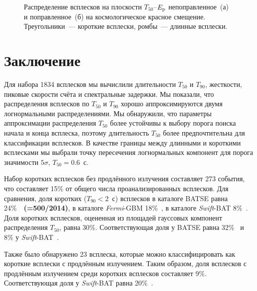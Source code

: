 \begin{figure}[h]
  \begin{minipage}[h]{0.5\textwidth}
  \end{minipage}
  \hfill
  \begin{minipage}[h]{0.5\textwidth}
  \end{minipage}
  \caption{Распределение всплесков на плоскости $T_{50}$--$E_{{\mathrm{p}}}$ непоправленное~(а) 
  и поправленное~(б) на космологическое красное смещение. 
  Треугольники~--- короткие всплески, ромбы~--- длинные всплески.}
  \label{img:T50EpzCorr}  
\end{figure}
\clearpage

\section{Заключение} \label{sec:Conclision}
Для набора 1834 всплесков мы вычислили длительности $T_{50}$ и $T_{90}$, жесткости, 
пиковые скорости счёта и спектральные задержки. Мы показали, что распределения 
всплесков по $T_{50}$ и $T_{90}$ хорошо аппроксимируются двумя логнормальными 
распределениями. Мы обнаружили, что параметры аппроксимации распределения $T_{50}$ 
более устойчивы к выбору порога поиска начала и конца всплеска, поэтому длительность 
$T_{50}$ более предпочтительна для классификации всплесков. В качестве границы между 
длинными и короткими всплесками мы выбрали точку пересечения логнормальных компонент 
для порога значимости $5\sigma$, $T_{50} = 0.6$~с. 

Набор коротких всплесков без продлённого излучения составляет 273 события, 
что составляет 15\% от общего числа проанализированных всплесков. Для сравнения, 
доля коротких ($T_{90}<2$~с) всплесков в каталоге BATSE равна 24\%~\citep{Meegan_2001}~\textbf{(=500/2014)}, 
в каталоге \textit{Fermi}-GBM 18\%~\citep{Paciesas_2012}, 
в каталоге \textit{Swift}-BAT 8\%~\citep{Sakamoto_2011ApJS}. 
Доля коротких всплесков, оцененная из площадей гауссовых компонент 
распределения $T_{50}$, равна 30\%. Соответствующая доля у BATSE равна 32\%~\citep{Horvath_2002} 
и 8\% у \textit{Swift}-BAT~\citep{Horvath_2008}.  

Также было обнаружено 23 всплеска, которые можно классифицировать как короткие 
всплески с продлённым излучением. Таким образом, доля всплесков с продлённым 
излучением среди коротких всплесков составляет 9\%. Соответствующая доля 
у \textit{Swift}-BAT равна 20\%~\citep{Sakamoto_2011ApJS}. 

